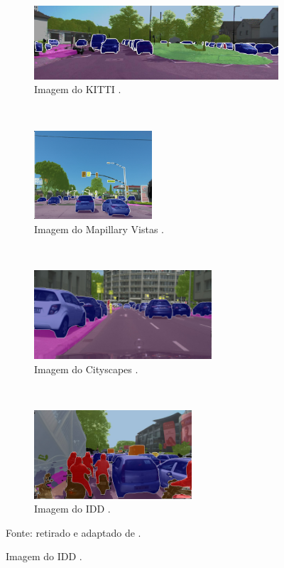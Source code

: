 \begin{figure}[H]
   \caption{Imagens de conjuntos de dados de segmentação panóptica.}
   \centering
   \label{panoptic:fig:3}
    \begin{subfigure}[t]{0.40\textwidth}
        \centering
        \includegraphics[width=1\linewidth]{recursos/imagens/panoptic/kitti.jpg}
        \caption{Imagem do KITTI \cite{Geiger2013}.}
        \label{panoptic:fig:3.1}
    \end{subfigure}%
    ~ 
    \begin{subfigure}[t]{0.50\textwidth}
        \centering
        \includegraphics[height=1.3in]{recursos/imagens/panoptic/vistas.jpg}
        \caption{Imagem do Mapillary Vistas \cite{Neuhold2017_ICCV}.}
        \label{panoptic:fig:3.2}
    \end{subfigure}%
    ~ 
    
    \begin{subfigure}[t]{0.45\textwidth}
        \centering
        \includegraphics[height=1.3in]{recursos/imagens/panoptic/cityscapes.jpg}
        \caption{Imagem do Cityscapes \cite{Cordts2016}.}
        \label{panoptic:fig:3.3}
    \end{subfigure}
    ~
    \begin{subfigure}[t]{0.45\textwidth}
        \centering
        \includegraphics[height=1.3in]{recursos/imagens/panoptic/idd.jpg}
        \caption{Imagem do IDD \cite{Varma2018}.}
        \label{panoptic:fig:3.4}
    \end{subfigure}

    Fonte: retirado e adaptado de \cite{Mohan2020}.
\end{figure}


